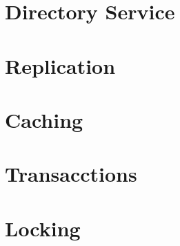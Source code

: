 \documentclass[11pt]{article}
\begin{document}
\section{Directory Service}
\label{sec:org64857a8}

\section{Replication}
\label{sec:org2576977}

\section{Caching}
\label{sec:orgdf28734}

\section{Transacctions}
\label{sec:org2a53f7c}

\section{Locking}
\label{sec:org87fe000}
\end{document}
